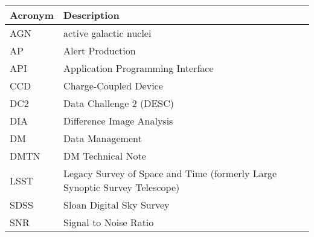 \addtocounter{table}{-1}
\begin{longtable}{p{}p{}}\hline
\textbf{Acronym} & \textbf{Description}  \\\hline

AGN & active galactic nuclei \\\hline
AP & Alert Production \\\hline
API & Application Programming Interface \\\hline
CCD & Charge-Coupled Device \\\hline
DC2 & Data Challenge 2 (DESC) \\\hline
DIA & Difference Image Analysis \\\hline
DM & Data Management \\\hline
DMTN & DM Technical Note \\\hline
LSST & Legacy Survey of Space and Time (formerly Large Synoptic Survey Telescope) \\\hline
SDSS & Sloan Digital Sky Survey \\\hline
SNR & Signal to Noise Ratio \\\hline
\end{longtable}

